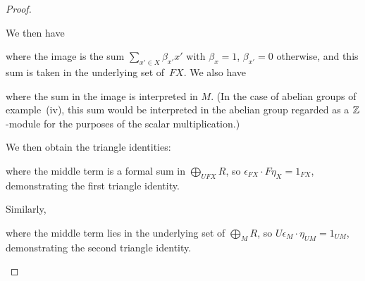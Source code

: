 \documentclass[../../solutions]{subfiles}
\begin{document}
\begin{proof}
\begin{enumerate}[label=(\roman*)]
    We then have
    \begin{center}
    \end{center}
    where the image is the sum $\sum_{x'\in X} \beta_{x'} x'$ with
    $\beta_x=1$, $\beta_{x'}=0$ otherwise, and this sum is taken in
    the underlying set of~$FX$.  We also have
    \begin{center}
    \end{center}
    where the sum in the image is interpreted in $M$.  (In the case of
    abelian groups of example~(iv), this sum would be interpreted in
    the abelian group regarded as a ${\mathbb{Z}}$-module for the purposes of
    the scalar multiplication.)

    We then obtain the triangle identities:
    \begin{center}
    \end{center}
    where the middle term is a formal sum in $\bigoplus_{UFX}R$, so
    $\epsilon_{FX}\cdot F\eta_X=1_{FX}$, demonstrating the first
    triangle identity.

    Similarly,
    \begin{center}
    \end{center}
    where the middle term lies in the underlying set of
    $\bigoplus_M R$, so $U\epsilon_M\cdot \eta_{UM}=1_{UM}$,
    demonstrating the second triangle identity.


\end{enumerate}
\end{proof}
\end{document}
